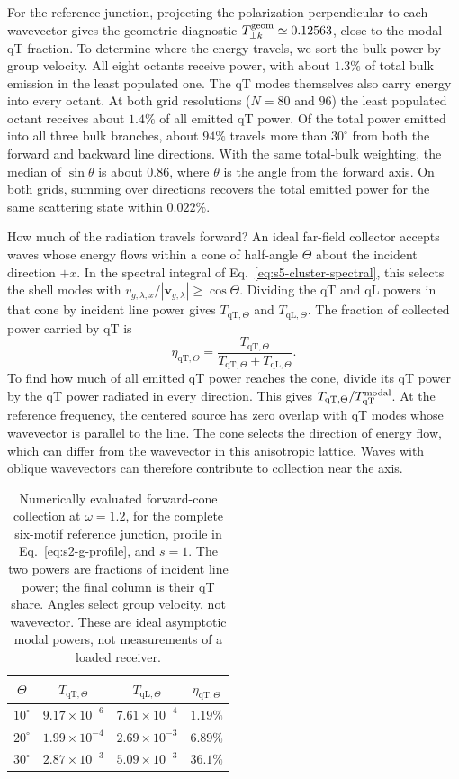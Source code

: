 \documentclass[10pt,aps,onecolumn,floatfix,notitlepage,nofootinbib,showkeys]{revtex4-2}
\newcommand{\qT}{\mathrm{qT}}
\newcommand{\qL}{\mathrm{qL}}
\begin{document}
For the reference junction, projecting the polarization perpendicular to each wavevector gives the geometric diagnostic $T_{\perp k}^{\rm geom}\simeq0.12563$, close to the modal qT fraction. To determine where the energy travels, we sort the bulk power by group velocity. All eight octants receive power, with about $1.3\%$ of total bulk emission in the least populated one. The qT modes themselves also carry energy into every octant. At both grid resolutions ($N=80$ and $96$) the least populated octant receives about $1.4\%$ of all emitted qT power. Of the total power emitted into all three bulk branches, about $94\%$ travels more than $30^\circ$ from both the forward and backward line directions. With the same total-bulk weighting, the median of $\sin\theta$ is about $0.86$, where $\theta$ is the angle from the forward axis. On both grids, summing over directions recovers the total emitted power for the same scattering state within $0.022\%$.

How much of the radiation travels forward? An ideal far-field collector accepts waves whose energy flows within a cone of half-angle $\Theta$ about the incident direction $+x$. In the spectral integral of Eq.~\eqref{eq:s5-cluster-spectral}, this selects the shell modes with $v_{g,\lambda,x}/|\bm v_{g,\lambda}|\geq\cos\Theta$. Dividing the qT and qL powers in that cone by incident line power gives $T_{\qT,\Theta}$ and $T_{\qL,\Theta}$. The fraction of collected power carried by qT is
\begin{equation}
 \eta_{\qT,\Theta}
 =\frac{T_{\qT,\Theta}}{T_{\qT,\Theta}+T_{\qL,\Theta}}.
 \label{pred:eq-cone-share}
\end{equation}
To find how much of all emitted qT power reaches the cone, divide its qT power by the qT power radiated in every direction. This gives $T_{\qT,\Theta}/T_{\qT}^{\rm modal}$. At the reference frequency, the centered source has zero overlap with qT modes whose wavevector is parallel to the line. The cone selects the direction of energy flow, which can differ from the wavevector in this anisotropic lattice. Waves with oblique wavevectors can therefore contribute to collection near the axis.

\begin{table}[tb]
 \centering
 \caption{Numerically evaluated forward-cone collection at $\omega=1.2$, for the complete six-motif reference junction, profile in Eq.~\eqref{eq:s2-g-profile}, and $s=1$. The two powers are fractions of incident line power; the final column is their qT share. Angles select group velocity, not wavevector. These are ideal asymptotic modal powers, not measurements of a loaded receiver.}
 \label{pred:tab-cone}
 \begin{tabular}{cccc}
 \toprule
 $\Theta$ & $T_{\qT,\Theta}$ & $T_{\qL,\Theta}$ & $\eta_{\qT,\Theta}$\\
 \midrule
 $10^\circ$ & $9.17\times10^{-6}$ & $7.61\times10^{-4}$ & $1.19\%$\\
 $20^\circ$ & $1.99\times10^{-4}$ & $2.69\times10^{-3}$ & $6.89\%$\\
 $30^\circ$ & $2.87\times10^{-3}$ & $5.09\times10^{-3}$ & $36.1\%$\\
 \bottomrule
 \end{tabular}
\end{table}
\end{document}
